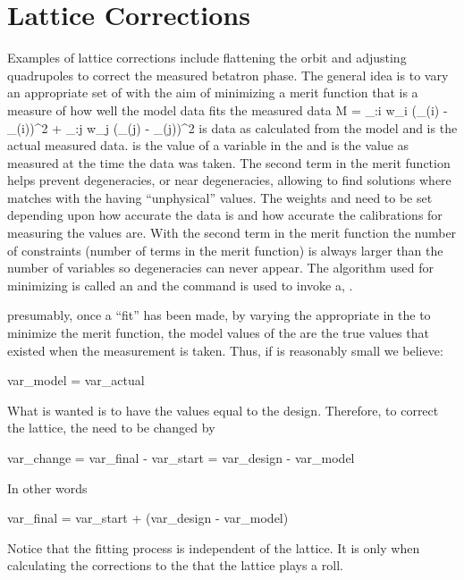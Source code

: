 \label{c:opti}


\section{Lattice Corrections}

Examples of lattice corrections include flattening the orbit and
adjusting quadrupoles to correct the measured betatron phase. The
general idea is to vary an appropriate set of  with the
aim of minimizing a merit function  that is a measure of how well the
model data fits the measured data
\Begineq
  {\cal M} = \sum_{\data:i} w_i 
    (\data\_\model(i) -  \data\_\meas(i))^2 + 
  \sum_{\var:j} w_j 
    (\var\_\model(j) - \var\_\meas(j))^2
  \label{m1}
\Endeq
{} is data as calculated from the model and
 is the actual measured data.  is the
value of a variable in the  and  is the value
as measured at the time the data was taken. The second term in the
merit function helps prevent degeneracies, or near degeneracies,
allowing \tao to find solutions where  matches
 with the  having ``unphysical''
values. The weights  and  need to be set depending
upon how accurate the data is and how accurate the calibrations for
measuring the  values are. With the second term in
the merit function the number of constraints (number of terms in the
merit function) is always larger than the number of variables so
degeneracies can never appear. The algorithm used for minimizing
 is called an  and the  command is used to
invoke a, .

presumably, once a ``fit'' has been made, by varying the appropriate
 in the  to minimize the merit function, the
model values of the  are the true values that existed
when the measurement is taken. Thus, if  is reasonably small we 
believe:
\begin{example}
  var_model = var_actual
\end{example}
What is wanted is to have the  values equal to the
design. Therefore, to correct the lattice, the  need to
be changed by
\begin{example}
  var_change = var_final  - var_start
             = var_design - var_model
\end{example}
In other words
\begin{example}
  var_final = var_start + (var_design - var_model)
\end{example}
Notice that the fitting process is independent of the 
lattice. It is only when calculating the corrections to the
 that the  lattice plays a roll. 

